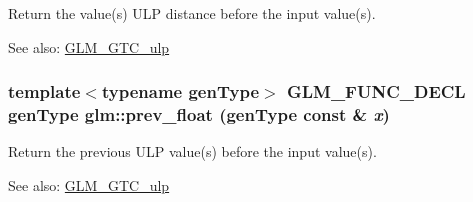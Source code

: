 Return the value(s) ULP distance before the input value(s). \begin{Desc}
\item[See also:]\hyperlink{group__gtc__ulp}{GLM\_\-GTC\_\-ulp} \end{Desc}
\hypertarget{group__gtc__ulp_gf1c61fb2a0092a4222dae424dd96aeb0}{
\subsubsection[prev\_\-float]{\setlength{\rightskip}{0pt plus 5cm}template$<$typename genType$>$ GLM\_\-FUNC\_\-DECL genType glm::prev\_\-float (genType const \& {\em x})}}
\label{group__gtc__ulp_gf1c61fb2a0092a4222dae424dd96aeb0}


Return the previous ULP value(s) before the input value(s). \begin{Desc}
\item[See also:]\hyperlink{group__gtc__ulp}{GLM\_\-GTC\_\-ulp} \end{Desc}
